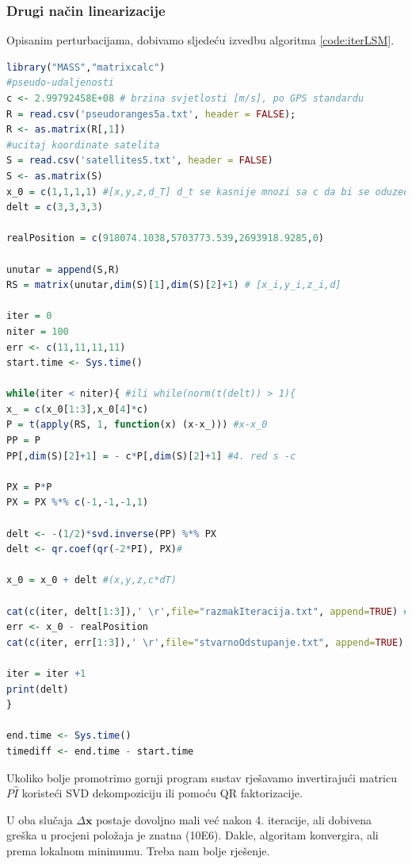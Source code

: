 \documentclass[a4paper,twoside,12pt]{memoir} %
\begin{document}
\subsubsection{Drugi način linearizacije}
Opisanim perturbacijama, dobivamo sljedeću izvedbu algoritma \ref{code:iterLSM}.
\begin{lstlisting}[language=R]
library("MASS","matrixcalc")
#pseudo-udaljenosti
c <- 2.99792458E+08 # brzina svjetlosti [m/s], po GPS standardu
R = read.csv('pseudoranges5a.txt', header = FALSE);
R <- as.matrix(R[,1])
#ucitaj koordinate satelita
S = read.csv('satellites5.txt', header = FALSE)
S <- as.matrix(S)
x_0 = c(1,1,1,1) #[x,y,z,d_T] d_t se kasnije mnozi sa c da bi se oduzeo od [x_i,y_i,z_i,d] 
delt = c(3,3,3,3)

realPosition = c(918074.1038,5703773.539,2693918.9285,0)

unutar = append(S,R)
RS = matrix(unutar,dim(S)[1],dim(S)[2]+1) # [x_i,y_i,z_i,d] 

iter = 0
niter = 100
err <- c(11,11,11,11)
start.time <- Sys.time()

while(iter < niter){ #ili while(norm(t(delt)) > 1){
x_ = c(x_0[1:3],x_0[4]*c)
P = t(apply(RS, 1, function(x) (x-x_))) #x-x_0
PP = P
PP[,dim(S)[2]+1] = - c*P[,dim(S)[2]+1] #4. red s -c

PX = P*P
PX = PX %*% c(-1,-1,-1,1)

delt <- -(1/2)*svd.inverse(PP) %*% PX
delt <- qr.coef(qr(-2*PI), PX)#

x_0 = x_0 + delt #(x,y,z,c*dT)

cat(c(iter, delt[1:3]),' \r',file="razmakIteracija.txt", append=TRUE) # upisivanje vrijednosti dx radi kasnije analize brzine i tocnosti postupka
err <- x_0 - realPosition
cat(c(iter, err[1:3]),' \r',file="stvarnoOdstupanje.txt", append=TRUE)

iter = iter +1
print(delt)  
}

end.time <- Sys.time()
timediff <- end.time - start.time
\end{lstlisting} %
Ukoliko bolje promotrimo gornji program sustav rješavamo invertirajući matricu $P\hat{I}$ koristeći SVD dekompoziciju  ili pomoću QR faktorizacije. %

U oba slučaja $\Delta \mathbf{x}$ postaje dovoljno mali već nakon 4. iteracije, ali dobivena greška u 
procjeni položaja je znatna (10E6).
Dakle, algoritam konvergira, ali prema lokalnom minimumu.
Treba nam bolje rješenje.

\end{document}

